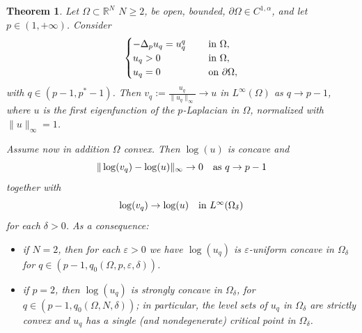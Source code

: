 \documentclass[11pt, reqno]{amsart}
\newtheorem{theorem}[lemma]{Theorem}
\theoremstyle{definition}
\numberwithin{equation}{section}
\newcommand{\R}{\mathbb{R}}
\def\eps{\varepsilon}
\def\norm#1{\|#1\|}
\begin{document}
\begin{theorem}
\label{thm_superhomog}
Let $\Omega \subset \R^N$ $N\geq 2$, be open, bounded, $\partial \Omega \in C^{1,\alpha}$, and let $p\in (1,+\infty)$. 
Consider
$$\begin{cases}
-\Delta_p u_q = u_q^{q} & \quad \hbox{ in $\Omega$},\\ 
u_q >0 & \quad \hbox{ in $\Omega$}, \\
u_q =0 & \quad \hbox{ on $\partial \Omega$},
\end{cases}$$
with $q \in (p-1, p^*-1)$. 
Then $v_q:=\frac{u_q}{\norm{u_q}_{\infty}}\to u$ in $L^{\infty}(\Omega)$ as $q \to p -1$, where $u$ is the first eigenfunction of the $p$-Laplacian in $\Omega$, normalized with $\norm{u}_{\infty}=1$.

Assume now in addition $\Omega$ convex. Then $\log(u)$ is concave and
$$\norm{\log(v_q) - \log(u)}_{\infty} \to 0 \quad \hbox{as $q \to p-1$}$$
together with
$$\log(v_q) \to \log(u) \quad \hbox{in $L^{\infty}(\Omega_{\delta})$}$$
for each $\delta>0$. 
As a consequence:
\begin{itemize}
\item if $N=2$, then for each $\eps>0$ we have $\log(u_q)$ is $\eps$-uniform concave in $\Omega_{\delta}$ for $q \in (p-1, q_0(\Omega,p,\eps, \delta))$.
\item if $p=2$, then $\log(u_q)$ is strongly concave in $\Omega_{\delta}$, for $q \in (p-1, q_0(\Omega,N,\delta))$; in particular, the level sets of $u_q$ in $\Omega_{\delta}$ 
are strictly convex and $u_q$ has a single (and nondegenerate) critical point in $\Omega_{\delta}$. 
\end{itemize}
\end{theorem}
\end{document}
